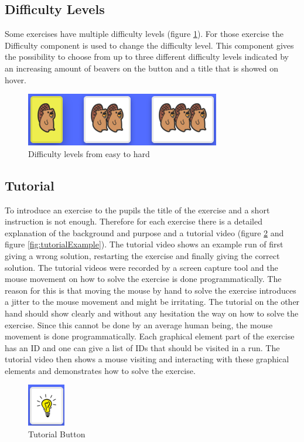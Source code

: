 \subsection*{Difficulty Levels}
Some exercises have multiple difficulty levels (figure \ref{fig:difficultyLevels}). For those exercise the Difficulty component is used to change the difficulty level. This component gives the possibility to choose from up to three different difficulty levels indicated by an increasing amount of beavers on the button and a title that is showed on hover.

\begin{figure} 
    \centering
    \includegraphics[width=0.4 \columnwidth]{figures/difficulty_level.png}
    \caption{Difficulty levels from easy to hard} 
    \label{fig:difficultyLevels} 
\end{figure}

\subsection*{Tutorial}
To introduce an exercise to the pupils the title of the exercise and a short instruction is not enough. Therefore for each exercise there is a detailed explanation of the background and purpose and a tutorial video (figure \ref{fig:tutorialButton} and figure \ref{fig:tutorialExample}). The tutorial video shows an example run of first giving a wrong solution, restarting the exercise and finally giving the correct solution.
The tutorial videos were recorded by a screen capture tool and the mouse movement on how to solve the exercise is done programmatically. The reason for this is that moving the mouse by hand to solve the exercise introduces a jitter to the mouse movement and might be irritating. The tutorial on the other hand should show clearly and without any hesitation the way on how to solve the exercise. Since this cannot be done by an average human being, the mouse movement is done programmatically. Each graphical element part of the exercise has an ID and one can give a list of IDs that should be visited in a run. The tutorial video then shows a mouse visiting and interacting with these graphical elements and demonstrates how to solve the exercise. 

\begin{figure} 
    \centering
    \includegraphics[width=0.1 \columnwidth]{figures/tutorial_button.png}
    \caption{Tutorial Button} 
    \label{fig:tutorialButton} 
\end{figure}

